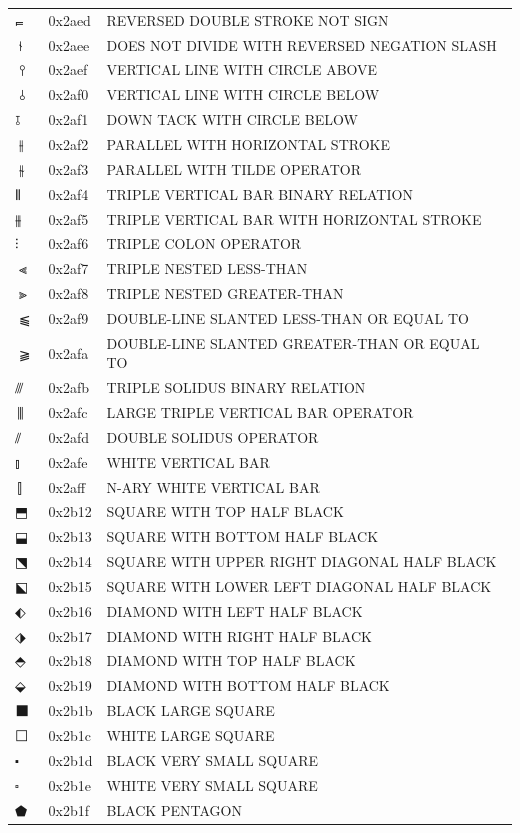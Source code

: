 \documentclass[12pt, twoside]{article}
\begin{document}
\begin{longtable}{L{1.0cm} L{2.0cm} >{\footnotesize}L{10cm}}
$⫭$&0x2aed&REVERSED DOUBLE STROKE NOT SIGN\\
$⫮$&0x2aee&DOES NOT DIVIDE WITH REVERSED NEGATION SLASH\\
$⫯$&0x2aef&VERTICAL LINE WITH CIRCLE ABOVE\\
$⫰$&0x2af0&VERTICAL LINE WITH CIRCLE BELOW\\
$⫱$&0x2af1&DOWN TACK WITH CIRCLE BELOW\\
$⫲$&0x2af2&PARALLEL WITH HORIZONTAL STROKE\\
$⫳$&0x2af3&PARALLEL WITH TILDE OPERATOR\\
$⫴$&0x2af4&TRIPLE VERTICAL BAR BINARY RELATION\\
$⫵$&0x2af5&TRIPLE VERTICAL BAR WITH HORIZONTAL STROKE\\
$⫶$&0x2af6&TRIPLE COLON OPERATOR\\
$⫷$&0x2af7&TRIPLE NESTED LESS-THAN\\
$⫸$&0x2af8&TRIPLE NESTED GREATER-THAN\\
$⫹$&0x2af9&DOUBLE-LINE SLANTED LESS-THAN OR EQUAL TO\\
$⫺$&0x2afa&DOUBLE-LINE SLANTED GREATER-THAN OR EQUAL TO\\
$⫻$&0x2afb&TRIPLE SOLIDUS BINARY RELATION\\
$⫼$&0x2afc&LARGE TRIPLE VERTICAL BAR OPERATOR\\
$⫽$&0x2afd&DOUBLE SOLIDUS OPERATOR\\
$⫾$&0x2afe&WHITE VERTICAL BAR\\
$⫿$&0x2aff&N-ARY WHITE VERTICAL BAR\\
$⬒$&0x2b12&SQUARE WITH TOP HALF BLACK\\
$⬓$&0x2b13&SQUARE WITH BOTTOM HALF BLACK\\
$⬔$&0x2b14&SQUARE WITH UPPER RIGHT DIAGONAL HALF BLACK\\
$⬕$&0x2b15&SQUARE WITH LOWER LEFT DIAGONAL HALF BLACK\\
$⬖$&0x2b16&DIAMOND WITH LEFT HALF BLACK\\
$⬗$&0x2b17&DIAMOND WITH RIGHT HALF BLACK\\
$⬘$&0x2b18&DIAMOND WITH TOP HALF BLACK\\
$⬙$&0x2b19&DIAMOND WITH BOTTOM HALF BLACK\\
$⬛$&0x2b1b&BLACK LARGE SQUARE\\
$⬜$&0x2b1c&WHITE LARGE SQUARE\\
$⬝$&0x2b1d&BLACK VERY SMALL SQUARE\\
$⬞$&0x2b1e&WHITE VERY SMALL SQUARE\\
$⬟$&0x2b1f&BLACK PENTAGON\\

\end{longtable}
\end{document}
